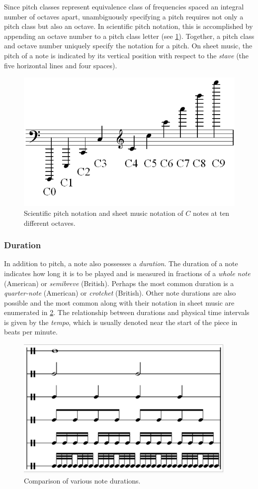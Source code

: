 Since pitch classes represent equivalence class of frequencies spaced an
integral number of octaves apart, unambiguously specifying a pitch requires not
only a pitch class but also an octave. In scientific pitch notation, this is
accomplished by appending an octave number to a pitch class letter (see
\cref{fig:pitch-class}). Together, a pitch class and octave number uniquely
specify the notation for a pitch. On sheet music, the pitch of a note is
indicated by its vertical position with respect to the \emph{stave} (the five
horizontal lines and four spaces).

\begin{figure}[htpb]
    \centering
    \includegraphics[width=0.6\linewidth]{Pitch_notation.png}
    \caption{Scientific pitch notation and sheet music notation of $C$ notes at ten different octaves.}
    \label{fig:pitch-class}
\end{figure}

\subsubsection{Duration}

In addition to pitch, a note also possesses a \emph{duration}. The duration of
a note indicates how long it is to be played and is measured in fractions of a
\emph{whole note} (American) or \emph{semibreve} (British). Perhaps the most
common duration is a \emph{quarter-note} (American) or \emph{crotchet}
(British). Other note durations are also possible and the most common along
with their notation in sheet music are enumerated in
\cref{fig:note-durations}. The relationship between durations and
physical time intervals is given by the \emph{tempo}, which is usually
denoted near the start of the piece in beats per minute.

\begin{figure}[htpb]
    \centering
    \includegraphics[width=0.6\linewidth]{note-durations.png}
    \caption{Comparison of various note durations.}
    \label{fig:note-durations}
\end{figure}

